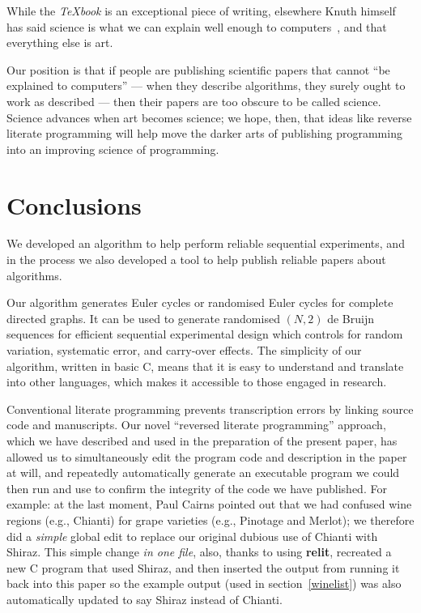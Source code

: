 \documentclass[12pt]{article}
\def\name#1{\textbf{#1}}
\begin{document}
While the \emph{\TeX book} is an exceptional piece of writing, elsewhere Knuth himself has said science is what we can explain well enough to computers~\cite{a=b}, and that everything else is art. 

Our position is that if people are publishing scientific papers that cannot ``be explained to computers'' --- when they describe algorithms, they surely ought to work as described --- then their papers are too obscure to be called science. Science advances when art becomes science; we hope, then, that ideas like reverse literate programming will help move the darker arts of publishing programming into an improving science of programming.

\section{Conclusions}
We developed an algorithm to help perform reliable sequential experiments, and in the process we also developed a tool to help publish reliable papers about algorithms.

Our algorithm generates Euler cycles or randomised Euler cycles for complete directed graphs. It can be used to generate randomised $(N,2)$ de Bruijn sequences for efficient sequential experimental design which controls for random variation, systematic error, and carry-over effects. The simplicity of our algorithm, written in basic C, means that it is easy to understand and translate into other languages, which makes it accessible to those engaged in research. 

Conventional literate programming prevents transcription errors by linking source code and manuscripts. Our novel ``reversed literate programming'' approach, which we have described and used in the preparation of the present paper, has allowed us to simultaneously edit the program code and description in the paper at will, and repeatedly automatically generate an executable program we could then run and use to confirm the integrity of the code we have published. For example: at the last moment, Paul Cairns pointed out that we had confused wine regions (e.g., Chianti) for grape varieties (e.g., Pinotage and Merlot); we therefore did a \emph{simple\/} global edit to replace our original dubious use of Chianti with Shiraz. This simple change \emph{in one file}, also, thanks to using \name{relit}, recreated a new C program that used Shiraz, and then inserted the output from running it back into this paper so the example output (used in section~\ref{winelist}) was also automatically updated to say Shiraz instead of Chianti.
\end{document}
